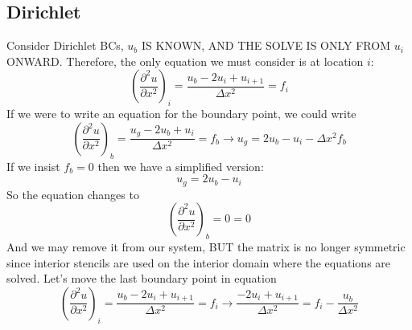 \documentclass[landscape]{article}
\begin{document}
\subsection{Dirichlet}
Consider Dirichlet BCs, $u_b$ IS KNOWN, AND THE SOLVE IS ONLY FROM $u_i$ ONWARD. Therefore, the only equation we must consider is at location $i$:
\begin{equation}
   \left(\frac{\partial^2 u}{\partial x^2}\right)_{i} = 
   \frac{u_b - 2 u_i + u_{i+1}}{\Delta x^2} = f_i
\end{equation}
If we were to write an equation for the boundary point, we could write
\begin{equation}
   \left(\frac{\partial^2 u}{\partial x^2}\right)_{b} = 
   \frac{u_g - 2 u_b + u_{i}}{\Delta x^2} = f_b
   \rightarrow
   u_g  = 2 u_b - u_{i} - \Delta x^2 f_b
\end{equation}
If we insist $f_b=0$ then we have a simplified version:
\begin{equation}
   u_g  = 2 u_b - u_{i}
\end{equation}
So the equation changes to
\begin{equation}
   \left(\frac{\partial^2 u}{\partial x^2}\right)_{b} = 
   0 = 0
\end{equation}
And we may remove it from our system, BUT the matrix is no longer symmetric since interior stencils are used on the interior domain where the equations are solved. Let's move the last boundary point in equation 
\begin{equation}
   \left(\frac{\partial^2 u}{\partial x^2}\right)_{i} = 
   \frac{u_b - 2 u_i + u_{i+1}}{\Delta x^2} = f_i
   \rightarrow
   \frac{- 2 u_i + u_{i+1}}{\Delta x^2} = f_i - \frac{u_b}{\Delta x^2}
\end{equation}
\end{document}
